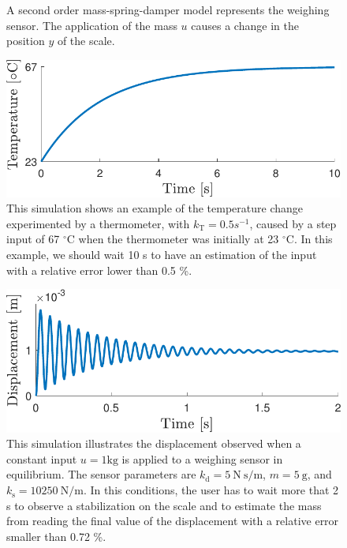 \begin{figure}[htb!]
\begin{tikzpicture}[every node/.style={draw,outer sep=0pt,thick}]
\end{tikzpicture}

\caption{\label{fig:simple_msd_system} \color{blue} A second order mass-spring-damper model represents the weighing sensor. The application of the mass $u$ causes a change in the position $y$ of the scale. \color{black} } 
\end{figure}


\begin{figure}[!htbp]
\centering
\includegraphics[width=0.69\columnwidth]{./ChapterIntroduction/fig/Fig_2.pdf} 
\caption{ \label{fig:thermometer} 
\color{blue} This simulation shows an example of the temperature change experimented by a thermometer, with $k_{\mathrm{T}}=0.5 s^{-1}$, caused by a step input of 67 $^{\circ} \mathrm{C}$  when the thermometer was initially at 23 $^{\circ} \mathrm{C}$. In this example, we should wait 10 s to have an estimation of the input with a relative error lower than 0.5 \%. \color{black} }
\end{figure}

\begin{figure}[!htbp]
\centering
\includegraphics[width=0.69\columnwidth]{./ChapterIntroduction/fig/Fig_3.pdf} 
\caption{ \label{fig:scale} 
\color{blue} This simulation illustrates the displacement observed when a constant input $u=1 \mathrm{kg}$ is applied to a weighing sensor in equilibrium. The sensor parameters are $k_{\mathrm{d}} = 5 \ \mathrm{N \ s/m}$, $m = 5 \ \mathrm{g}$, and $k_{\mathrm{s}} = 10250 \ \mathrm{N/m}$. In this conditions, the user has to wait more that 2 s to observe a stabilization on the scale and to estimate the mass from reading the final value of the displacement with a relative error smaller than 0.72 \%. \color{black}  }
\end{figure}

